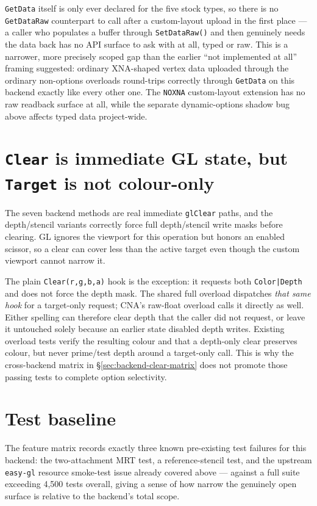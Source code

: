 \texttt{GetData} itself is only ever declared for the five stock types, so there is no
\texttt{GetDataRaw} counterpart to call after a custom-layout upload in the first place --- a
caller who populates a buffer through \texttt{SetDataRaw()} and then genuinely needs the data
back has no API surface to ask with at all, typed or raw. This is a narrower, more precisely
scoped gap than the earlier ``not implemented at all'' framing suggested: ordinary XNA-shaped
vertex data uploaded through the ordinary non-options overloads round-trips correctly through
\texttt{GetData} on this backend exactly like every other one. The \texttt{NOXNA}
custom-layout extension has no raw readback surface at all, while the separate dynamic-options
shadow bug above affects typed data project-wide.

\section{\texttt{Clear} is immediate GL state, but \texttt{Target} is not colour-only}

The seven backend methods are real immediate \texttt{glClear} paths, and the depth/stencil
variants correctly force full depth/stencil write masks before clearing. GL ignores the
viewport for this operation but honors an enabled scissor, so a clear can cover less than the
active target even though the custom viewport cannot narrow it.

The plain \texttt{Clear(r,g,b,a)} hook is the exception: it requests both
\texttt{Color|Depth} and does not force the depth mask. The shared full overload dispatches
\emph{that same hook} for a target-only request; CNA's raw-float overload calls it
directly as well. Either spelling can therefore clear depth that the caller did not request,
or leave it untouched solely because an earlier state disabled depth writes. Existing overload
tests verify the resulting colour and that a depth-only clear preserves colour, but never
prime/test depth around a target-only call. This is why the cross-backend matrix in
\S\ref{sec:backend-clear-matrix} does not promote those passing tests to complete option
selectivity.

\section{Test baseline}

The feature matrix records exactly three known pre-existing test failures for this backend:
the two-attachment MRT test, a reference-stencil test, and the upstream \texttt{easy-gl}
resource smoke-test issue already covered above --- against a full suite exceeding 4{,}500
tests overall, giving a sense of how narrow the genuinely open surface is relative to the
backend's total scope.

